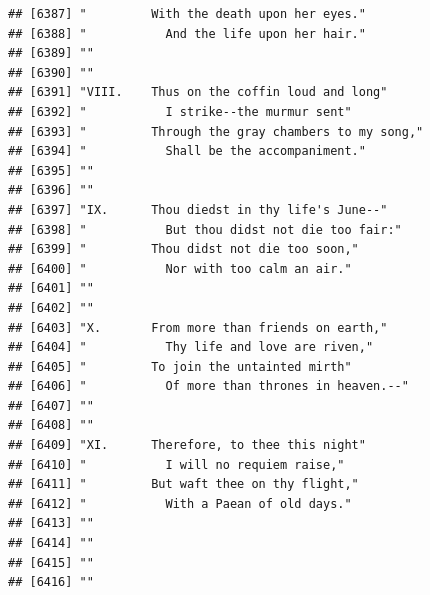 \documentclass{article}\usepackage[]{graphicx}\usepackage[]{color}
\makeatletter
\newenvironment{kframe}{%
 \def\at@end@of@kframe{}%
 \ifinner\ifhmode%
  \def\at@end@of@kframe{\end{minipage}}%
  \begin{minipage}{\columnwidth}%
 \fi\fi%
 \def\FrameCommand##1{\hskip\@totalleftmargin \hskip-\fboxsep
 \colorbox{shadecolor}{##1}\hskip-\fboxsep
     \hskip-\linewidth \hskip-\@totalleftmargin \hskip\columnwidth}%
 \MakeFramed {\advance\hsize-\width
   \@totalleftmargin\z@ \linewidth\hsize
   \@setminipage}}%
 {\par\unskip\endMakeFramed%
 \at@end@of@kframe}
\newenvironment{knitrout}{}{} %
\makeatother
\begin{document}
\begin{knitrout}
\begin{kframe}
\begin{verbatim}
## [6387] "         With the death upon her eyes."                                      
## [6388] "           And the life upon her hair."                                      
## [6389] ""                                                                            
## [6390] ""                                                                            
## [6391] "VIII.    Thus on the coffin loud and long"                                   
## [6392] "           I strike--the murmur sent"                                        
## [6393] "         Through the gray chambers to my song,"                              
## [6394] "           Shall be the accompaniment."                                      
## [6395] ""                                                                            
## [6396] ""                                                                            
## [6397] "IX.      Thou diedst in thy life's June--"                                   
## [6398] "           But thou didst not die too fair:"                                 
## [6399] "         Thou didst not die too soon,"                                       
## [6400] "           Nor with too calm an air."                                        
## [6401] ""                                                                            
## [6402] ""                                                                            
## [6403] "X.       From more than friends on earth,"                                   
## [6404] "           Thy life and love are riven,"                                     
## [6405] "         To join the untainted mirth"                                        
## [6406] "           Of more than thrones in heaven.--"                                
## [6407] ""                                                                            
## [6408] ""                                                                            
## [6409] "XI.      Therefore, to thee this night"                                      
## [6410] "           I will no requiem raise,"                                         
## [6411] "         But waft thee on thy flight,"                                       
## [6412] "           With a Paean of old days."                                        
## [6413] ""                                                                            
## [6414] ""                                                                            
## [6415] ""                                                                            
## [6416] ""                                                                            

\end{verbatim}
\end{kframe}
\end{knitrout}
\end{document}

